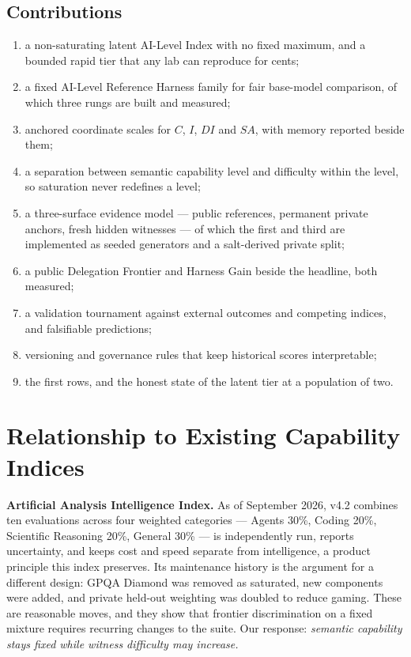 \subsection{Contributions}
\begin{enumerate}[leftmargin=*,itemsep=1pt]
\item a non-saturating latent AI-Level Index with no fixed maximum, and a bounded rapid tier that any lab can reproduce for cents;
\item a fixed AI-Level Reference Harness family for fair base-model comparison, of which three rungs are built and measured;
\item anchored coordinate scales for $C$, $I$, $DI$ and $SA$, with memory reported beside them;
\item a separation between semantic capability level and difficulty within the level, so saturation never redefines a level;
\item a three-surface evidence model --- public references, permanent private anchors, fresh hidden witnesses --- of which the first and third are implemented as seeded generators and a salt-derived private split;
\item a public Delegation Frontier and Harness Gain beside the headline, both measured;
\item a validation tournament against external outcomes and competing indices, and falsifiable predictions;
\item versioning and governance rules that keep historical scores interpretable;
\item the first rows, and the honest state of the latent tier at a population of two.
\end{enumerate}

\section{Relationship to Existing Capability Indices}\label{sec:related}

\textbf{Artificial Analysis Intelligence Index.} As of September 2026, v4.2 combines ten evaluations across four weighted categories --- Agents 30\%, Coding 20\%, Scientific Reasoning 20\%, General 30\% \citep{aa2026index} --- is independently run, reports uncertainty, and keeps cost and speed separate from intelligence, a product principle this index preserves. Its maintenance history is the argument for a different design: GPQA Diamond was removed as saturated, new components were added, and private held-out weighting was doubled to reduce gaming. These are reasonable moves, and they show that frontier discrimination on a fixed mixture requires recurring changes to the suite. Our response: \emph{semantic capability stays fixed while witness difficulty may increase.}

